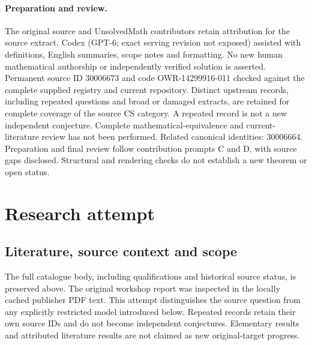 \documentclass[11pt]{article}
\begin{document}
\paragraph{Preparation and review.}
The original source and UnsolvedMath contributors retain attribution for the source extract. Codex (GPT-6; exact serving revision not exposed) assisted with definitions, English summaries, scope notes and formatting. No new human mathematical authorship or independently verified solution is asserted. Permanent source ID 30006673 and code OWR-14299916-011 checked against the complete supplied registry and current repository. Distinct upstream records, including repeated questions and broad or damaged extracts, are retained for complete coverage of the source CS category. A repeated record is not a new independent conjecture. Complete mathematical-equivalence and current-literature review has not been performed. Related canonical identities: 30006664. Preparation and final review follow contribution prompts C and D, with source gaps disclosed. Structural and rendering checks do not establish a new theorem or open status.
\label{end:30006673}

\section{Research attempt}
\subsection{Literature, source context and scope}
The full catalogue body, including qualifications and historical source status, is preserved above. The original workshop report was inspected in the locally cached publisher PDF text. This attempt distinguishes the source question from any explicitly restricted model introduced below. Repeated records retain their own source IDs and do not become independent conjectures. Elementary results and attributed literature results are not claimed as new original-target progress.
\end{document}
